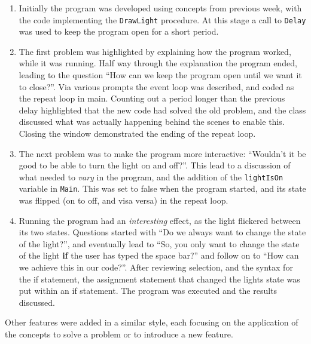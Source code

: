 \begin{enumerate}
  \item Initially the program was developed using concepts from previous week, with the code implementing the \texttt{DrawLight} procedure. At this stage a call to \texttt{Delay} was used to keep the program open for a short period.
  \item The first problem was highlighted by explaining how the program worked, while it was running. Half way through the explanation the program ended, leading to the question ``How can we keep the program open until we want it to close?''. Via various prompts the event loop was described, and coded as the repeat loop in main. Counting out a period longer than the previous delay highlighted that the new code had solved the old problem, and the class discussed what was actually happening behind the scenes to enable this. Closing the window demonstrated the ending of the repeat loop.
  \item The next problem was to make the program more interactive: ``Wouldn't it be good to be able to turn the light on and off?''. This lead to a discussion of what needed to \emph{vary} in the program, and the addition of the \texttt{lightIsOn} variable in \texttt{Main}. This was set to false when the program started, and its state was flipped (on to off, and visa versa) in the repeat loop.
  \item Running the program had an \emph{interesting} effect, as the light flickered between its two states. Questions started with ``Do we always want to change the state of the light?'', and eventually lead to ``So, you only want to change the state of the light \textbf{if} the user has typed the space bar?'' and follow on to ``How can we achieve this in our code?''. After reviewing selection, and the syntax for the if statement, the assignment statement that changed the lights state was put within an if statement. The program was executed and the results discussed.
\end{enumerate}

Other features were added in a similar style, each focusing on the application of the concepts to solve a problem or to introduce a new feature.  


